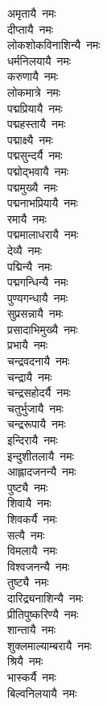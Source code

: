 \begin{multicols}{2}
\begin{flushleft}
अमृतायै~नमः\\
दीप्तायै~नमः\\
लोकशोकविनाशिन्यै~नमः\\
धर्मनिलयायै~नमः\\
करुणायै~नमः\\
लोकमात्रे~नमः\hfill{}\\
पद्मप्रियायै~नमः\\
पद्महस्तायै~नमः\\
पद्माक्ष्यै~नमः\\
पद्मसुन्दर्यै~नमः\\
पद्मोद्भवायै~नमः\\
पद्ममुख्यै~नमः\\
पद्मनाभप्रियायै~नमः\\
रमायै~नमः\\
पद्ममालाधरायै~नमः\\
देव्यै~नमः\hfill{}\\
पद्मिन्यै~नमः\\
पद्मगन्धिन्यै~नमः\\
पुण्यगन्धायै~नमः\\
सुप्रसन्नायै~नमः\\
प्रसादाभिमुख्यै~नमः\\
प्रभायै~नमः\\
चन्द्रवदनायै~नमः\\
चन्द्रायै~नमः\\
चन्द्रसहोदर्यै~नमः\\
चतुर्भुजायै~नमः\hfill{}\\
चन्द्ररूपायै~नमः\\
इन्दिरायै~नमः\\
इन्दुशीतलायै~नमः\\
आह्लादजनन्यै~नमः\\
पुष्ट्यै~नमः\\
शिवायै~नमः\\
शिवकर्यै~नमः\\
सत्यै~नमः\\
विमलायै~नमः\\
विश्वजनन्यै~नमः\hfill{}\\
तुष्ट्यै~नमः\\
दारिद्र्यनाशिन्यै~नमः\\
प्रीतिपुष्करिण्यै~नमः\\
शान्तायै~नमः\\
शुक्लमाल्याम्बरायै~नमः\\
श्रियै~नमः\\
भास्कर्यै~नमः\\
बिल्वनिलयायै~नमः\\

\end{flushleft}
\end{multicols}
